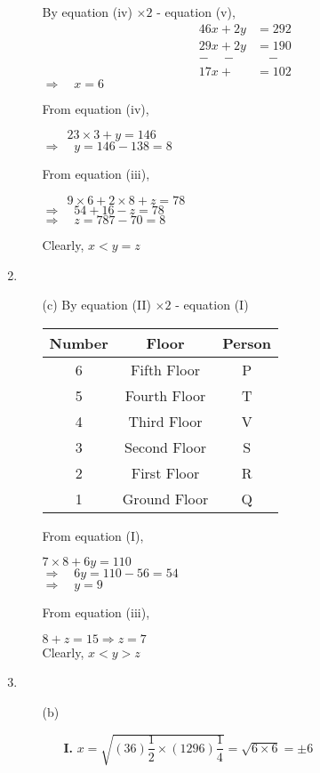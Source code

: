 \begin{multicols}{2}
\begin{enumerate}
\begin{itemize}
By equation (iv) $\times 2$ - equation (v),
\begin{equation*}
  \begin{array}{cc}
    46x + 2y & = 292\\
    29x + 2y & = 190\\
    - \quad - & \quad -\\
    \hline
    17x + & = 102\tag*{...(iv)}
  \end{array}
\end{equation*}
$\Rightarrow \quad x = 6$

From equation (iv),

$\qquad 23 \times 3 + y = 146$\\
$\Rightarrow \quad y = 146 - 138 = 8$

From equation (iii),

$\qquad 9 \times 6 + 2 \times 8 + z = 78$\\
$\Rightarrow \quad 54 + 16 - z = 78$\\
$\Rightarrow \quad z = 787 - 70 = 8$

Clearly, $x < y = z$
  \end{itemize}
\item
  \begin{itemize}
  \item[(c)] By equation (II) $\times 2$ - equation (I)

\begin{tabular}{|c|c|c|}
\hline
{\bf Number} & {\bf Floor} & {\bf Person}\\
\hline
6 & Fifth Floor & P\\
\hline
5 & Fourth Floor & T\\
\hline
4 & Third Floor & V\\
\hline
3 & Second Floor & S\\
\hline
2 & First Floor & R\\
\hline
1 & Ground Floor & Q\\
\hline
\end{tabular}

From equation (I),

$7 \times 8 + 6y = 110$\\
$\Rightarrow \quad 6y = 110 - 56 = 54$\\
$\Rightarrow \quad y = 9$

From equation (iii),

$8 + z = 15 \Rightarrow z = 7$\\
Clearly, $x < y > z$
\end{itemize}
\item
  \begin{itemize}
  \item[(b)]
    \begin{itemize}
    \item[{\bf I.}] $x = \sqrt{(36) \dfrac{1}{2} \times (1296) \dfrac{1}{4}} = \sqrt{6 \times 6} = \pm 6$


\end{itemize}
\end{itemize}
\end{enumerate}
\end{multicols}

